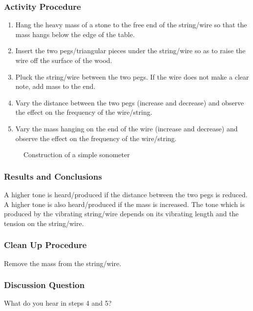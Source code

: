 \subsubsection*{Activity Procedure}
\begin{enumerate}
\item{Hang the heavy mass of a stone to the free end of the string/wire so that the mass hangs below the edge of the table.} 
\item{Insert the two pegs/triangular pieces under the string/wire so as to raise the wire off the surface of the wood.} 
\item{Pluck the string/wire between the two pegs. If the wire does not make a clear note, add mass to the end.} 
\item{Vary the distance between the two pegs (increase and decrease) and observe the effect on the frequency of the wire/string.} 
\item{Vary the mass hanging on the end of the wire (increase and decrease) and observe the effect on the frequency of the wire/string.} 
\end{enumerate}

\begin{figure}
\begin{center}
\def\svgwidth{200pt}

\caption{Construction of a simple sonometer}
\label{fig:sonometert}
\end{center}
\end{figure}

\subsubsection*{Results and Conclusions}
A higher tone is heard/produced if the distance between the two pegs is reduced. A higher tone is also heard/produced if the mass is increased.  
The tone which is produced by the vibrating string/wire depends on its vibrating length and the tension on the string/wire.

\subsubsection*{Clean Up Procedure}
Remove the mass from the string/wire.

\subsubsection*{Discussion Question}
What do you hear in steps 4 and 5?

